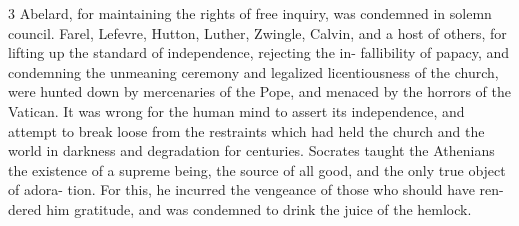 \documentclass[10pt]{article}
\begin{document}
\begin{multicols}{3}
	Abelard, for maintaining the rights of free inquiry, was condemned in\linebreak
	solemn council. Farel, Lefevre, Hutton, Luther, Zwingle, Calvin, and
	a\linebreak
	host of others, for lifting up the standard of independence,
	rejecting the in-\linebreak
	fallibility of papacy, and condemning the unmeaning ceremony and\linebreak
	legalized licentiousness of the church, were hunted down by
	mercenaries of\linebreak
	the Pope, and menaced by the horrors of the Vatican. It was wrong for\linebreak
	the human mind to assert its independence, and attempt to break
	loose from\linebreak
	the restraints which had held the church and the world in darkness
	and\linebreak
	degradation for centuries. Socrates taught the Athenians the
	existence of\linebreak
	a supreme being, the source of all good, and the only true object of
	adora-\linebreak
	tion. For this, he incurred the vengeance of those who should have
	ren-\linebreak
	dered him gratitude, and was condemned to drink the juice of the hemlock.


\end{multicols}
\end{document}
